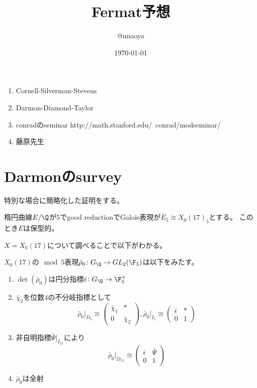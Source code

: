 \documentclass{jsarticle}
\title{Fermat予想}
\author{@unaoya}
\date{\today}
\begin{document}
\maketitle
\begin{enumerate}
\item Cornell-Silverman-Stevens
\item  Darmon-Diamond-Taylor
\item conradのseminar http://math.stanford.edu/~conrad/modseminar/
\item 藤原先生
\end{enumerate}

\section{Darmonのsurvey}
特別な場合に簡略化した証明をする。
\begin{thm}
楕円曲線$E/\Q$が$5$でgood reductionでGalois表現が$E_5\cong X_0(17)_5$とする。
このとき$E$は保型的。
\end{thm}

$X=X_0(17)$について調べることで以下がわかる。
\begin{lem}
$X_0(17)$の$\mod 5$表現$\bar{\rho}_0\colon G_\Q\to GL_2(\F_5)$は以下をみたす。
\begin{enumerate}
\item $\det(\bar{\rho}_0)$は円分指標$\bar{\epsilon}\colon G_\Q\to \F_5^\times$
\item $\bar{\chi}_2$を位数$4$の不分岐指標として
\[
\bar{\rho}_0\vert_{D_5}\cong\begin{pmatrix}\bar{\chi}_1&*\\0&\bar{\chi}_2\end{pmatrix},
\bar{\rho}_0\vert_{I_5}\cong\begin{pmatrix}\bar{\epsilon}&*\\0&1\end{pmatrix}
\]
\item 非自明指標$\bar{\Psi}\vert_{I_{17}}$により
\[
\bar{\rho}_0\vert_{D_{17}}\cong\begin{pmatrix}\bar{\epsilon}&\bar{\Psi}\\0&1\end{pmatrix}
\]
\item $\bar{\rho}_0$は全射
\end{enumerate}
\end{lem}
\end{document}
